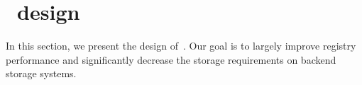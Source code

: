 \section{\sysname~design}
\label{sec:slimmer}

%




In this section, we present the design of~\sysname. 
Our goal is to largely improve registry performance and significantly decrease the storage requirements on backend storage systems.






